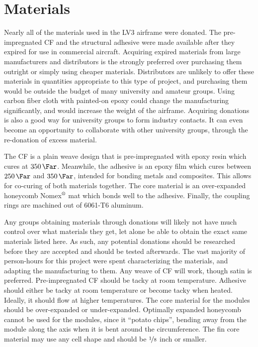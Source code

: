 \documentclass{aiaa-tc}%
\newcommand{\mathregistered}{\text{\textregistered}}
\begin{document}
\section{Materials}
Nearly all of the materials used in the LV3 airframe were donated. The pre-impregnated CF and the structural adhesive were made available after they expired for use in commercial aircraft. 
Acquiring expired materials from large manufacturers and distributors is the strongly preferred over purchasing them outright or simply using cheaper materials. 
Distributors are unlikely to offer these materials in quantities appropriate to this type of project, and purchasing them would be outside the budget of many university and amateur groups. 
Using carbon fiber cloth with painted-on epoxy could change the manufacturing significantly, and would increase the weight of the airframe. 
Acquiring donations is also a good way for university groups to form industry contacts. It can even become an opportunity to collaborate with other university groups, through the re-donation of excess material. 

The CF is a plain weave design that is pre-impregnated with epoxy resin which cures at $\SI{350}{\Far}$.
Meanwhile, the adhesive is an epoxy film which cures between $\SI{250}{\Far}$ and $\SI{350}{\Far}$, intended for bonding metals and composites. 
This allows for co-curing of both materials together. The core material is an over-expanded honeycomb Nomex$^\mathregistered$ mat which bonds well to the adhesive.
Finally, the coupling rings are machined out of 6061-T6 aluminum. 

Any groups obtaining materials through donations will likely not have much control over what materials they get, let alone be able to obtain the exact same materials listed here.
As such, any potential donations should be researched before they are accepted and should be tested afterwards. 
The vast majority of person-hours for this project were spent characterizing the materials, and adapting the manufacturing to them.
Any weave of CF will work, though satin is preferred. Pre-impregnated CF should be tacky at room temperature.
Adhesive should either be tacky at room temperature or become tacky when heated. Ideally, it should flow at higher temperatures. 
The core material for the modules should be over-expanded or under-expanded. 
Optimally expanded honeycomb cannot be used for the modules, since it ``potato chips'', bending away from the module along the axis when it is bent around the circumference. 
The fin core material may use any cell shape and should be $\nicefrac{1}{8}$ inch or smaller. 
\end{document}
